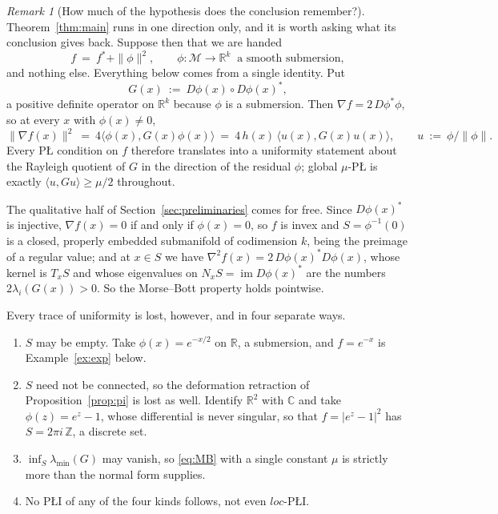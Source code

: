 \documentclass[11pt]{article}
\theoremstyle{plain}
\theoremstyle{definition}
\theoremstyle{remark}
\newtheorem{rem}[thm]{Remark}
\newcommand{\M}{\mathcal{M}}
\newcommand{\R}{\mathbb{R}}
\newcommand{\Z}{\mathbb{Z}}
\newcommand{\C}{\mathbb{C}}
\begin{document}
\begin{rem}[How much of the hypothesis does the conclusion remember?]
\label{rem:converse}
Theorem~\ref{thm:main} runs in one direction only, and it is worth asking what
its conclusion gives back. Suppose then that we are handed
\[
  f \ =\ f^* + \|\phi\|^2 , \qquad
  \phi\colon\M\to\R^k \ \text{ a smooth submersion} ,
\]
and nothing else. Everything below comes from a single identity. Put
\[
  G(x) \ :=\ D\phi(x)\circ D\phi(x)^* ,
\]
a positive definite operator on $\R^k$ because $\phi$ is a submersion. Then
$\nabla f = 2\,D\phi^*\phi$, so at every $x$ with $\phi(x)\ne0$,
\begin{equation}\label{eq:rayleigh}
  \|\nabla f(x)\|^2
  \ =\ 4\bigl\langle \phi(x), G(x)\phi(x)\bigr\rangle
  \ =\ 4\,h(x)\,\bigl\langle u(x), G(x)u(x)\bigr\rangle ,
  \qquad u \ :=\ \phi/\|\phi\| .
\end{equation}
Every P\L{} condition on $f$ therefore translates into a uniformity statement
about the Rayleigh quotient of $G$ in the direction of the residual $\phi$;
global $\mu$-P\L{} is exactly $\langle u, Gu\rangle \ge \mu/2$ throughout.

The qualitative half of Section~\ref{sec:preliminaries} comes for free. Since
$D\phi(x)^*$ is injective, $\nabla f(x)=0$ if and only if $\phi(x)=0$, so $f$ is
invex and $S = \phi^{-1}(0)$ is a closed, properly embedded submanifold of
codimension $k$, being the preimage of a regular value; and at $x\in S$ we have
$\nabla^2f(x) = 2\,D\phi(x)^*D\phi(x)$, whose kernel is $T_xS$ and whose
eigenvalues on $N_xS = \operatorname{im}D\phi(x)^*$ are the numbers
$2\lambda_i(G(x))>0$. So the Morse--Bott property holds pointwise.

Every trace of uniformity is lost, however, and in four separate ways.
\begin{enumerate}
\item[(i)] $S$ may be empty. Take $\phi(x) = e^{-x/2}$ on $\R$, a submersion, and
$f = e^{-x}$ is Example~\ref{ex:exp} below.
\item[(ii)] $S$ need not be connected, so the deformation retraction of
Proposition~\ref{prop:pi} is lost as well. Identify $\R^2$ with $\C$ and take
$\phi(z) = e^z-1$, whose differential is never singular, so that
$f = |e^z-1|^2$ has $S = 2\pi i\,\Z$, a discrete set.
\item[(iii)] $\inf_S \lambda_{\min}(G)$ may vanish, so \eqref{eq:MB} with a
single constant $\mu$ is strictly more than the normal form supplies.
\item[(iv)] No P\L{}I of any of the four kinds follows, not even $loc$-P\L{}I.
\end{enumerate}


\end{rem}
\end{document}
